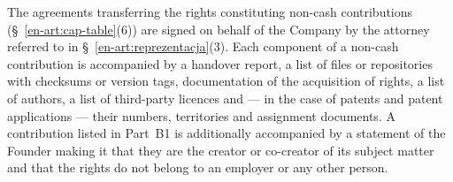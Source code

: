 \documentclass[12pt,a4paper]{report}
\begin{document}
The agreements transferring the rights constituting non-cash contributions (\S~\ref{en-art:cap-table}(6)) are signed on behalf of the Company by the attorney referred to in \S~\ref{en-art:reprezentacja}(3). Each component of a non-cash contribution is accompanied by a handover report, a list of files or repositories with checksums or version tags, documentation of the acquisition of rights, a list of authors, a list of third-party licences and --- in the case of patents and patent applications --- their numbers, territories and assignment documents. A contribution listed in Part~B1 is additionally accompanied by a statement of the Founder making it that they are the creator or co-creator of its subject matter and that the rights do not belong to an employer or any other person.
\end{document}
